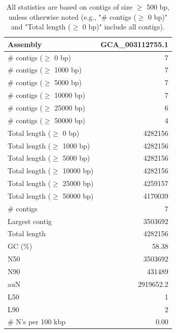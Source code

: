 \documentclass[12pt,a4paper]{article}
\begin{document}
\begin{table}[ht]
\begin{center}
\caption{All statistics are based on contigs of size $\geq$ 500 bp, unless otherwise noted (e.g., "\# contigs ($\geq$ 0 bp)" and "Total length ($\geq$ 0 bp)" include all contigs).}
\begin{tabular}{|l*{1}{|r}|}
\hline
Assembly & GCA\_003112755.1 \\ \hline
\# contigs ($\geq$ 0 bp) & 7 \\ \hline
\# contigs ($\geq$ 1000 bp) & 7 \\ \hline
\# contigs ($\geq$ 5000 bp) & 7 \\ \hline
\# contigs ($\geq$ 10000 bp) & 7 \\ \hline
\# contigs ($\geq$ 25000 bp) & 6 \\ \hline
\# contigs ($\geq$ 50000 bp) & 4 \\ \hline
Total length ($\geq$ 0 bp) & 4282156 \\ \hline
Total length ($\geq$ 1000 bp) & 4282156 \\ \hline
Total length ($\geq$ 5000 bp) & 4282156 \\ \hline
Total length ($\geq$ 10000 bp) & 4282156 \\ \hline
Total length ($\geq$ 25000 bp) & 4259157 \\ \hline
Total length ($\geq$ 50000 bp) & 4170039 \\ \hline
\# contigs & 7 \\ \hline
Largest contig & 3503692 \\ \hline
Total length & 4282156 \\ \hline
GC (\%) & 58.38 \\ \hline
N50 & 3503692 \\ \hline
N90 & 431489 \\ \hline
auN & 2919652.2 \\ \hline
L50 & 1 \\ \hline
L90 & 2 \\ \hline
\# N's per 100 kbp & 0.00 \\ \hline
\end{tabular}
\end{center}
\end{table}
\end{document}
